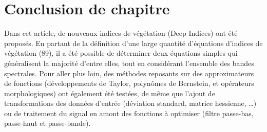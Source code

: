 \documentclass[../thesis.tex]{subfiles}
\begin{document}
	

	\newpage
	\section{Conclusion de chapitre}
	
	Dans cet article, de nouveaux indices de végétation (Deep Indices) ont été proposés. En partant de la définition d'une large quantité d'équations d'indices de végétation (89), il a été possible de déterminer deux équations simples qui généralisent la majorité d'entre elles, tout en considérant l'ensemble des bandes spectrales. Pour aller plus loin, des méthodes reposants sur des approximateurs de fonctions (développements de Taylor, polynômes de Bernstein, et opérateurs morphologiques) ont également été testées, de même que l'ajout de transformations des données d'entrée (déviation standard, matrice hessienne, \dots) ou de traitement du signal en amont des fonctions à optimiser (filtre passe-bas, passe-haut et passe-bande).
    
\end{document}
